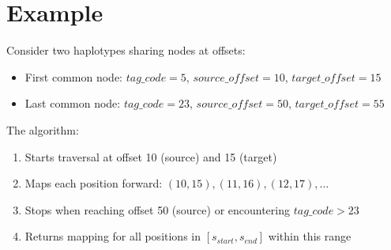 \documentclass[11pt]{article}
\begin{document}
\section{Example}

Consider two haplotypes sharing nodes at offsets:
\begin{itemize}
    \item First common node: $tag\_code = 5$, $source\_offset = 10$, $target\_offset = 15$
    \item Last common node: $tag\_code = 23$, $source\_offset = 50$, $target\_offset = 55$
\end{itemize}

The algorithm:
\begin{enumerate}
    \item Starts traversal at offset 10 (source) and 15 (target)
    \item Maps each position forward: $(10,15), (11,16), (12,17), \ldots$
    \item Stops when reaching offset 50 (source) or encountering $tag\_code > 23$
    \item Returns mapping for all positions in $[s_{start}, s_{end}]$ within this range
\end{enumerate}
\end{document}
